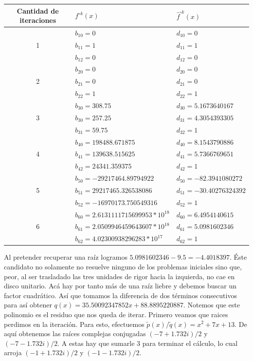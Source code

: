 \documentclass[oneside,11pt]{book}
\theoremstyle{definition}
\theoremstyle{plain}
\theoremstyle{remark}
\begin{document}
\begin{center}
\begin{tabular}{ |c | l | l | }
\hline
 Cantidad de iteraciones & $f^{\circ k}(x)$ & $\hat{f}^{\circ k}(x)$\\
 \hline 
& $b_{10}= 0$ & $d_{10}= 0 $\\
1 & $b_{11}= 1$ &$d_{11}=1 $  \\ 
& $b_{12}= 0$ & $d_{12}=0$\\  
 \hline 
& $b_{20}= 0$ & $d_{20}= 0 $\\
2 & $b_{21}= 0$ & $d_{21}=0 $  \\ 
& $b_{22}= 1$ & $d_{22}=1$\\
\hline
& $b_{30}= 308.75$ & $d_{30}= 5.1673640167$\\
3 & $b_{30}= 257.25$ & $d_{31}= 4.3054393305$\\
& $b_{31}= 59.75$ & $d_{32}=1$  \\ 
\hline
& $b_{40}= 198488.671875$ & $d_{40}= 8.1543790886$\\
4 & $b_{41}= 139638.515625$ & $d_{41}= 5.7366769651$\\
& $b_{42}= 24341.359375$ & $d_{42}=1$  \\ 
\hline
& $b_{50}= -29217464.89794922$ & $d_{50}=-82.3941080272$\\
5 & $b_{51}= 29217465.326538086$ & $d_{51}=-30.40276324392$\\
& $b_{52}= -16970173.750549316$ & $d_{52}=1$  \\ 
\hline
& $b_{60}= 2.6131111715699953*10^{18}$ & $d_{60}=6.4954140615$\\
6 & $b_{61}= 2.0509946459643607*10^{18}$ & $d_{61}=5.0981602346$\\
& $b_{62}= 4.02300938296283*10^{17}$ & $d_{62}=1$  \\ 
\hline
\end{tabular}
\end{center}
\bigskip

Al pretender recuperar una ra\'iz logramos $5.0981602346-9.5=-4.4018397$. 
\'Este candidato no solamente no resuelve ninguno de los problemas iniciales sino que, peor, 
al ser trasladado las tres unidades de rigor hacia la izquierda, no cae en disco unitario. 
Ac\'a hay por tanto m\'as de una ra\'iz liebre y debemos buscar un factor cuadr\'atico. 
As\'i que tomamos la diferencia de dos t\'erminos consecutivos 
para as\'i obtener $q(x)=35.50092347852x+88.8895220887$.
Notemos que este polinomio es el residuo que nos queda de iterar.
Primero veamos que raices perdimos en la iteraci\'on. 
Para esto, efectuemos $\tilde{p}(x)/\tilde{q}(x)=x^2+7x+13$. 
De aqu\'i obtenemos las ra\'ices complejas conjugadas $(-7+1.732i)/2$ y $(-7-1.732i)/2$. 
A estas hay que sumarle $3$ para terminar el c\'alculo, lo cual arroja $(-1+1.732i)/2$ y $(-1-1.732i)/2$.
\end{document}
